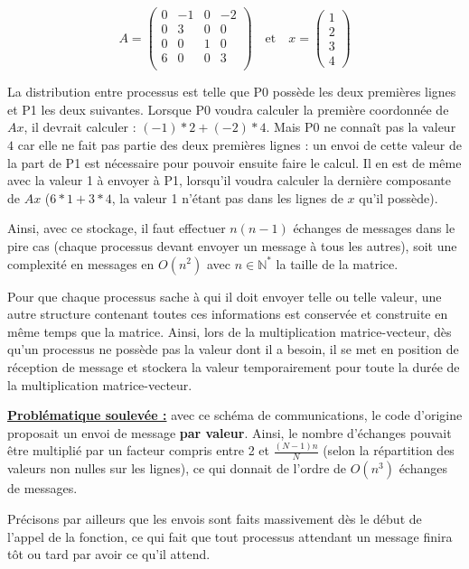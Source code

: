 \documentclass[11pt,a4paper,oneside]{memoir}
\newcommand{\N}{\mathbb{N}}	\newcommand{\Z}{\mathbb{Z}}
\theoremstyle{definition}
\theoremstyle{remark}
\theoremstyle{plain}
\begin{document}
\[
A =
\begin{pmatrix}
0 & -1 & 0 & -2\\
0 & 3 & 0 & 0\\
0 & 0 & 1 & 0\\
6 & 0 & 0 & 3\\
\end{pmatrix} \quad \text{et} \quad
x = 
\begin{pmatrix}
1\\
2\\
3\\
4
\end{pmatrix}
\]

La distribution entre processus est telle que P0 possède les deux premières lignes et P1 les deux suivantes. Lorsque P0 voudra calculer la première coordonnée de $Ax$, il devrait calculer : $(-1) * 2 + (-2) * 4$. Mais P0 ne connaît pas la valeur $4$ car elle ne fait pas partie des deux premières lignes : un envoi de cette valeur de la part de P1 est nécessaire pour pouvoir ensuite faire le calcul. Il en est de même avec la valeur 1 à envoyer à P1, lorsqu'il voudra calculer la dernière composante de $Ax$ ($6*1+3*4$, la valeur 1 n'étant pas dans les lignes de $x$ qu'il possède).

Ainsi, avec ce stockage, il faut effectuer $n(n-1)$ échanges de messages dans le pire cas (chaque processus devant envoyer un message à tous les autres), soit une complexité en messages en $O(n^2)$ avec $n \in \N^*$ la taille de la matrice.\bigskip

Pour que chaque processus sache à qui il doit envoyer telle ou telle valeur, une autre structure contenant toutes ces informations est conservée et construite en même temps que la matrice. Ainsi, lors de la multiplication matrice-vecteur, dès qu'un processus ne possède pas la valeur dont il a besoin, il se met en position de réception de message et stockera la valeur temporairement pour toute la durée de la multiplication matrice-vecteur.\bigskip

\textbf{\underline{Problématique soulevée :}} avec ce schéma de communications, le code d'origine proposait un envoi de message \textbf{par valeur}. Ainsi, le nombre d'échanges pouvait être multiplié par un facteur compris entre 2 et $\frac{(N-1)n}{N}$ (selon la répartition des valeurs non nulles sur les lignes), ce qui donnait de l'ordre de $O(n^3)$ échanges de messages.

Précisons par ailleurs que les envois sont faits massivement dès le début de l'appel de la fonction, ce qui fait que tout processus attendant un message finira tôt ou tard par avoir ce qu'il attend.\bigskip
\end{document}
